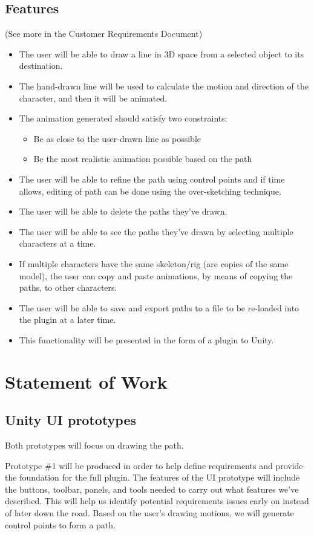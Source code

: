 \documentclass[12pt]{article}
\begin{document}
\subsection{Features}
(See more in the Customer Requirements Document)
\begin{itemize}
 \item The user will be able to draw a line in 3D space from a selected object to its destination.
 \item The hand-drawn line will be used to calculate the motion and direction of the character, and then it will be animated.
 \item The animation generated should satisfy two constraints:
	\begin{itemize}
	  \item Be as close to the user-drawn line as possible
	  \item Be the most realistic animation possible based on the path
	\end{itemize}
 \item The user will be able to refine the path using control points and if time allows, editing of path can be done using the over-sketching technique.
 \item The user will be able to delete the paths they've drawn.
 \item The user will be able to see the paths they've drawn by selecting multiple characters at a time.
 \item If multiple characters have the same skeleton/rig (are copies of the same model), the user can copy and paste animations, by means of copying the paths, to other characters.
\item The user will be able to save and export paths to a file to be re-loaded into the plugin at a later time.
 \item This functionality will be presented in the form of a plugin to Unity.
\end{itemize}


\section{Statement of Work}
\label{sec:work}
\subsection{Unity UI prototypes}
Both prototypes will focus on drawing the path.

Prototype \#1 will be produced in order to help define requirements and provide the foundation for the full plugin. The features of the UI prototype will include the buttons, toolbar, panels, and tools needed to carry out what features we've described. This will help us identify potential requirements issues early on instead of later down the road. Based on the user's drawing motions, we will generate control points to form a path.
\end{document}
